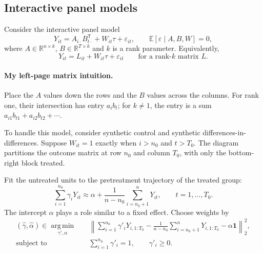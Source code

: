 \subsection{Interactive panel models}
Consider the interactive panel model
\[
 Y_{it}=A_{i\cdot}B_{t\cdot}^{\mathsf T}+W_{it}\tau+\varepsilon_{it},
 \qquad\mathbb E[\varepsilon\mid A,B,W]=0,\tag{8.5}
\]
where $A\in\mathbb R^{n\times k}$, $B\in\mathbb R^{T\times k}$ and $k$ is a rank parameter. Equivalently,
\[
 Y_{it}=L_{it}+W_{it}\tau+\varepsilon_{it}
 \qquad\text{for a rank-$k$ matrix }L.
\]
\paragraph{My left-page matrix intuition.}
Place the $A$ values down the rows and the $B$ values across the columns. For rank one, their intersection has entry $a_i b_t$; for $k\ne1$, the entry is a sum $a_{i1}b_{t1}+a_{i2}b_{t2}+\cdots$. \begin{center}\end{center}

To handle this model, consider synthetic control and synthetic differences-in-differences. Suppose $W_{it}=1$ exactly when $i>n_0$ and $t>T_0$. The diagram partitions the outcome matrix at row $n_0$ and column $T_0$, with only the bottom-right block treated.
\begin{center}\end{center}


Fit the untreated units to the pretreatment trajectory of the treated group:
\[
 \sum_{i=1}^{n_0}\gamma_iY_{it}
 \approx\alpha+\frac1{n-n_0}\sum_{i=n_0+1}^nY_{it},
 \qquad t=1,\ldots,T_0.
\]
 The intercept $\alpha$ plays a role similar to a fixed effect. Choose weights by
\begin{align*}
 (\widehat\gamma,\widehat\alpha)\in
 \operatorname*{arg\,min}_{\gamma',\alpha}\quad&
 \left\|\sum_{i=1}^{n_0}\gamma'_iY_{i,1:T_0}
 -\frac1{n-n_0}\sum_{i=n_0+1}^nY_{i,1:T_0}
 -\alpha\mathbf1\right\|_2^2,\\
 \text{subject to}\quad&\sum_{i=1}^{n_0}\gamma'_i=1,
 \qquad\gamma'_i\ge0.\tag{8.7}
\end{align*}

